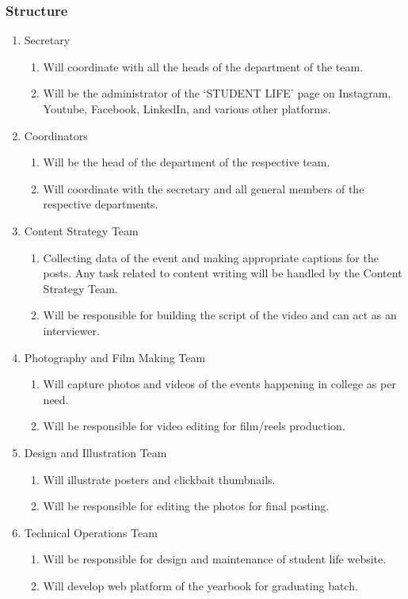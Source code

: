 \documentclass[12pt]{article}
\begin{document}
\subsubsection{Structure}
\begin{enumerate}
    \item Secretary
    \begin{enumerate}
        \item Will coordinate with all the heads of the department of the team.
        \item Will be the administrator of the ‘STUDENT LIFE’ page on Instagram, Youtube, Facebook, LinkedIn, and various other platforms.
    \end{enumerate}
    \item Coordinators
    \begin{enumerate}
        \item Will be the head of the department of the respective team.
        \item Will coordinate with the secretary and all general members of the respective departments.
    \end{enumerate}
    \item Content Strategy Team
    \begin{enumerate}
        \item Collecting data of the event and making appropriate captions for the posts. Any task related to content writing will be handled by the Content Strategy Team.
        \item Will be responsible for building the script of the video and can act as an interviewer.
    \end{enumerate}
    \item Photography and Film Making Team
    \begin{enumerate}
        \item Will capture photos and videos of the events happening in college as per need.
        \item Will be responsible for video editing for film/reels production.
    \end{enumerate}
    \item Design and Illustration Team
    \begin{enumerate}
        \item Will illustrate posters and clickbait thumbnails.
        \item Will be responsible for editing the photos for final posting.
    \end{enumerate}
    \item Technical Operations Team
    \begin{enumerate}
        \item Will be responsible for design and maintenance of student life website.
        \item Will develop web platform of the yearbook for graduating batch.
    \end{enumerate}
\end{enumerate}
\end{document}

